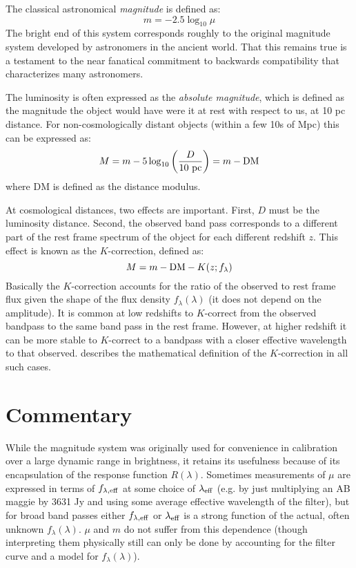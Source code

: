The classical astronomical {\it magnitude} is defined as:
\begin{equation}
m = -2.5 \log_{10} \mu
\end{equation}
The bright end of this system corresponds roughly to the original
magnitude system developed by astronomers in the ancient world. That
this remains true is a testament to the near fanatical commitment to
backwards compatibility that characterizes many astronomers.

The luminosity is often expressed as the {\it absolute magnitude},
which is defined as the magnitude the object would have were it at
rest with respect to us, at 10 pc distance. For non-cosmologically
distant objects (within a few 10s of Mpc) this can be expressed as:
\begin{equation}
M = m - 5 \log_{10} \left(\frac{D}{10 {\rm ~pc}}\right) = m - {\rm DM}
\end{equation}
where DM is defined as the distance modulus. 

At cosmological distances, two effects are important. First, $D$ must
be the luminosity distance. Second, the observed band pass corresponds
to a different part of the rest frame spectrum of the object for each
different redshift $z$. This effect is known as the $K$-correction,
defined as:
\begin{equation}
M = m - {\rm DM} - K(z; f_\lambda)
\end{equation}
Basically the $K$-correction accounts for the ratio of the observed to
rest frame flux given the shape of the flux density
$f_\lambda(\lambda)$ (it does not depend on the amplitude). It is
common at low redshifts to $K$-correct from the observed bandpass to
the same band pass in the rest frame. However, at higher redshift it
can be more stable to $K$-correct to a bandpass with a closer
effective wavelength to that observed. \citet{hogg02c} describes the
mathematical definition of the $K$-correction in all such cases. 

\section{Commentary}

While the magnitude system was originally used for convenience in
calibration over a large dynamic range in brightness, it retains its
usefulness because of its encapsulation of the response function
$R(\lambda)$.  Sometimes measurements of $\mu$ are expressed in terms
of $f_{\lambda, {\rm eff}}$ at some choice of $\lambda_{\rm eff}$
(e.g. by just multiplying an AB maggie by 3631 Jy and using some
average effective wavelength of the filter), but for broad band passes
either $f_{\lambda, {\rm eff}}$ or $\lambda_{\rm eff}$ is a strong
function of the actual, often unknown $f_\lambda(\lambda)$. $\mu$ and
$m$ do not suffer from this dependence (though interpreting them
physically still can only be done by accounting for the filter curve
and a model for $f_\lambda(\lambda)$).

